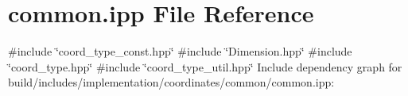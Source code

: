 \hypertarget{build_2includes_2implementation_2coordinates_2common_2common_8ipp}{}\section{common.\+ipp File Reference}
\label{build_2includes_2implementation_2coordinates_2common_2common_8ipp}
{\ttfamily \#include \char`\"{}coord\+\_\+type\+\_\+const.\+hpp\char`\"{}}\newline
{\ttfamily \#include \char`\"{}Dimension.\+hpp\char`\"{}}\newline
{\ttfamily \#include \char`\"{}coord\+\_\+type.\+hpp\char`\"{}}\newline
{\ttfamily \#include \char`\"{}coord\+\_\+type\+\_\+util.\+hpp\char`\"{}}\newline
Include dependency graph for build/includes/implementation/coordinates/common/common.ipp\+:
